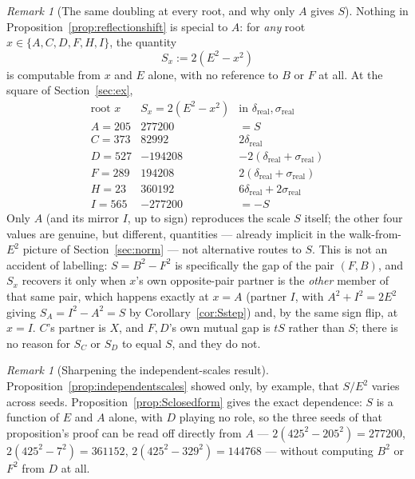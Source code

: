\documentclass[12pt]{article}
\theoremstyle{remark}
\newtheorem{remark}[theorem]{Remark}
\begin{document}
\begin{remark}[The same doubling at every root, and why only $A$ gives $S$]
Nothing in Proposition~\ref{prop:reflectionshift} is special to $A$:
for \emph{any} root $x\in\{A,C,D,F,H,I\}$, the quantity
\[
S_x := 2(E^2-x^2)
\]
is computable from $x$ and $E$ alone, with no reference to $B$ or $F$
at all. At the square of Section~\ref{sec:ex},
\[
\begin{array}{c|c|c}
\text{root } x & S_x = 2(E^2-x^2) & \text{in } \delta_{\text{real}},
\sigma_{\text{real}} \\ \hline
A = 205 & 277200 & =S \\
C = 373 & 82992 & 2\delta_{\text{real}} \\
D = 527 & -194208 & -2(\delta_{\text{real}}+\sigma_{\text{real}}) \\
F = 289 & 194208 & 2(\delta_{\text{real}}+\sigma_{\text{real}}) \\
H = 23 & 360192 & 6\delta_{\text{real}}+2\sigma_{\text{real}} \\
I = 565 & -277200 & =-S
\end{array}
\]
Only $A$ (and its mirror $I$, up to sign) reproduces the scale $S$
itself; the other four values are genuine, but different, quantities
--- already implicit in the walk-from-$E^2$ picture of
Section~\ref{sec:norm} --- not alternative routes to $S$. This is not
an accident of labelling: $S=B^2-F^2$ is specifically the gap of the
pair $(F,B)$, and $S_x$ recovers it only when $x$'s own opposite-pair
partner is the \emph{other} member of that same pair, which happens
exactly at $x=A$ (partner $I$, with $A^2+I^2=2E^2$ giving
$S_A=I^2-A^2=S$ by Corollary~\ref{cor:Sstep}) and, by the same sign
flip, at $x=I$. $C$'s partner is $X$, and $F,D$'s own mutual gap is
$tS$ rather than $S$; there is no reason for $S_C$ or $S_D$ to equal
$S$, and they do not.
\end{remark}

\begin{remark}[Sharpening the independent-scales result]
Proposition~\ref{prop:independentscales} showed only, by example, that
$S/E^2$ varies across seeds. Proposition~\ref{prop:Sclosedform} gives
the exact dependence: $S$ is a function of $E$ and $A$ alone, with $D$
playing no role, so the three seeds of that proposition's proof can be
read off directly from $A$ --- $2(425^2-205^2)=277200$,
$2(425^2-7^2)=361152$, $2(425^2-329^2)=144768$ --- without computing
$B^2$ or $F^2$ from $D$ at all.
\end{remark}
\end{document}
